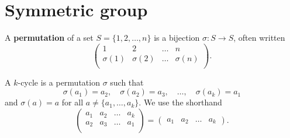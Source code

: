\chapter{Symmetric group}

\begin{definition}[Permutation]
    A \textbf{permutation} of a set $S = \{1,2,\ldots,n\}$ is a bijection 
    $\sigma: S \to S$, often written
    \[
        \begin{pmatrix}
            1 & 2 & \ldots & n \\
            \sigma(1) & \sigma(2) & \ldots & \sigma(n) \\
        \end{pmatrix}
        .
    \]
\end{definition}

\begin{definition}[Cycle]
    A $k$-cycle is a permutation $\sigma$ such that
    \[
        \sigma(a_1) = a_2, \quad \sigma(a_2) = a_3, \quad \ldots, 
        \quad \sigma(a_k) = a_1
    \]
    and $\sigma(a) = a$ for all $a \neq \{a_1, \ldots, a_k\}$.
    We use the shorthand
    \[
        \begin{pmatrix}
            a_1 & a_2 & \ldots & a_k \\
            a_2 & a_3 & \ldots & a_1 \\
        \end{pmatrix}
        =
        \begin{pmatrix}
            a_1 & a_2 & \ldots & a_k
        \end{pmatrix}
        .
    \]
\end{definition}

